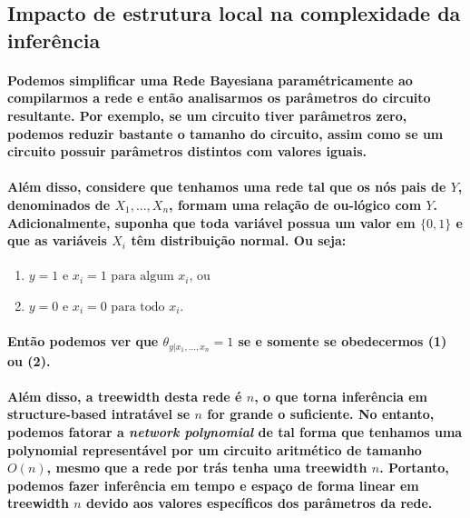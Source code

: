 \documentclass[a4paper,10pt]{article}
\theoremstyle{plain}
\begin{document}
\subsection{Impacto de estrutura local na complexidade da inferência}

\paragraph{
  Podemos simplificar uma Rede Bayesiana paramétricamente ao compilarmos a rede e então analisarmos
  os parâmetros do circuito resultante. Por exemplo, se um circuito tiver parâmetros zero, podemos
  reduzir bastante o tamanho do circuito, assim como se um circuito possuir parâmetros distintos
  com valores iguais.
}

\paragraph{
  Além disso, considere que tenhamos uma rede tal que os nós pais de $Y$, denominados de
  $X_1,...,X_n$, formam uma relação de ou-lógico com $Y$. Adicionalmente, suponha que toda
  variável possua um valor em $\{0,1\}$ e que as variáveis $X_i$ têm distribuição normal. Ou seja:
}

\begin{enumerate}
  \item $y=1 \text{ e } x_i=1 \text{ para algum $x_i$, ou}$
  \item $y=0 \text{ e } x_i=0 \text{ para todo $x_i$.}$
\end{enumerate}

\paragraph{
  Então podemos ver que $\theta_{y|x_1,...,x_n}=1$ se e somente se obedecermos (1) ou (2).
}

\paragraph{
  Além disso, a treewidth desta rede é $n$, o que torna inferência em structure-based intratável se
  $n$ for grande o suficiente. No entanto, podemos fatorar a \textit{network polynomial}
  \cite{report-1} de tal forma que tenhamos uma polynomial representável por um circuito aritmético
  \cite{report-1} de tamanho $O(n)$, mesmo que a rede por trás tenha uma treewidth $n$. Portanto,
  podemos fazer inferência em tempo e espaço de forma linear em treewidth $n$ devido aos valores
  específicos dos parâmetros da rede.
}
\end{document}

